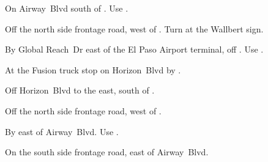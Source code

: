 
\begin{LocationList}

On Airway~Blvd south of .
Use  .

Off the north side  frontage road, west of .
Turn at the Wallbert sign.

By Global Reach~Dr east of the El Paso Airport terminal, off .
Use  .

At the Fusion truck stop on  Horizon~Blvd by .

\Location{\GarageHQ \Garage}
Off  Horizon~Blvd to the east, south of .

Off the north side  frontage road, west of .

By  east of Airway~Blvd.
Use  .

On the south side  frontage road, east of Airway~Blvd.

\end{LocationList}
